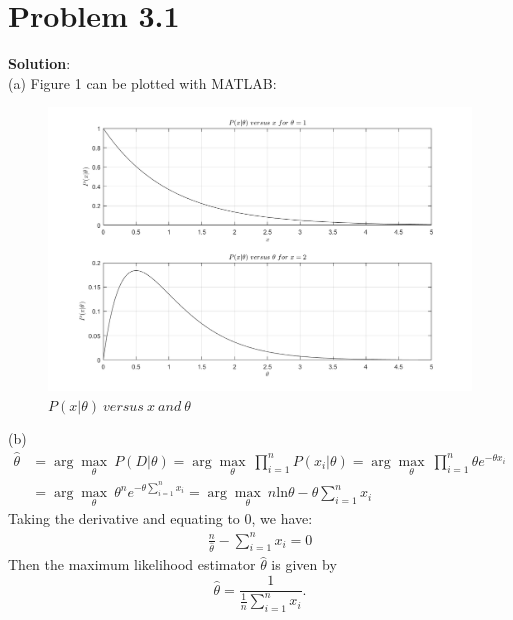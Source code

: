 \documentclass[12pt]{article}
\begin{document}
\section{Problem 3.1}
\large{\textbf{Solution}}: \\
(a) Figure 1 can be plotted with MATLAB:
\begin{figure}[H]
\centering
\includegraphics[width = 1\textwidth]{PR31.png}
\caption{\label{fig2}$P(x|\theta)\ versus\ x\ and\ \theta$}
\end{figure}
\noindent(b) \\
\begin{equation*}
\begin{aligned}
\hat{\theta} &=\arg\max_{\theta}\ P(D|\theta) = \arg\max_{\theta}\ \prod_{i=1}^{n} P(x_i|\theta) =\arg\max_{\theta}\ \prod_{i=1}^{n} \theta e^{-\theta x_i}\\ &=\arg\max_{\theta}\ \theta^n e^{-\theta \sum^{n}_{i=1}x_i} =\arg\max_{\theta}\ n\text{ln}\theta-\theta \sum^{n}_{i=1}x_i
\end{aligned}
\end{equation*}
Taking the derivative and equating to 0, we have:
\begin{equation*}
\begin{aligned}
\frac{n}{\hat{\theta}}-\sum^{n}_{i=1}x_i = 0
\end{aligned}
\end{equation*}
Then the maximum likelihood estimator $\hat{\theta}$ is given by
\begin{equation*}
\hat{\theta}=\frac{1}{\frac{1}{n}\sum^{n}_{i=1}x_i}.
\end{equation*}

\vfill
\clearpage
\end{document}
